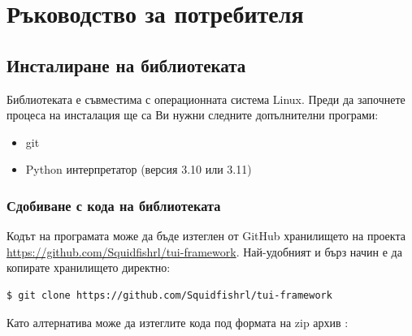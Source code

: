 \chapter{Ръководство за потребителя}
\hfill

\section{Инсталиране на библиотеката}
        Библиотеката е съвместима с операционната система Linux. 
        Преди да започнете процеса на инсталация ще са Ви нужни следните 
        допълнителни програми:

        \begin{itemize}
                \item git
                \item Python интерпретатор (версия 3.10 или 3.11)
        \end{itemize}

        \subsection{Сдобиване с кода на библиотеката}

                Кодът на програмата може да бъде изтеглен от GitHub хранилището
                на проекта \url{https://github.com/Squidfishrl/tui-framework}.
                Най-удобният и бърз начин е да копирате хранилището директно:

                \begin{lstlisting}[style=shell]
                        $ git clone https://github.com/Squidfishrl/tui-framework
                \end{lstlisting}

                Като алтернатива може да изтеглите кода под формата на zip архив
                :
        
